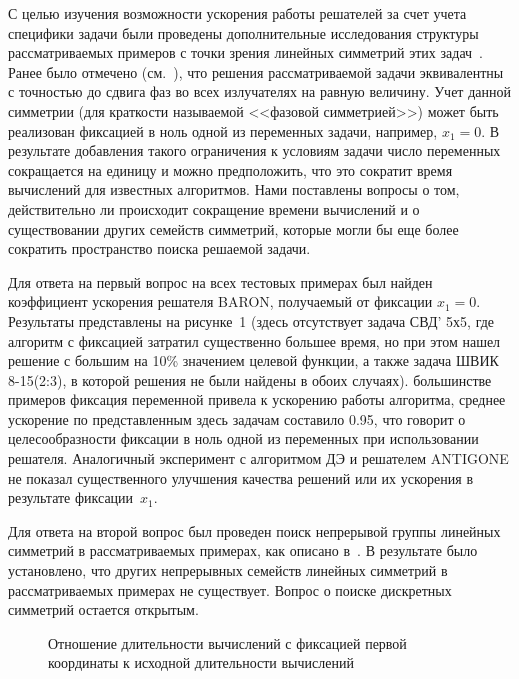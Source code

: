С целью изучения возможности ускорения работы решателей за счет учета специфики задачи были проведены дополнительные исследования
структуры рассматриваемых примеров с точки зрения линейных симметрий этих задач~\cite{yurkov:symmetry}.
Ранее было отмечено (см.~\cite{tyu:daor}), что решения рассматриваемой задачи эквивалентны с точностью до сдвига
фаз во всех излучателях на равную величину.
Учет данной симметрии (для краткости называемой <<фазовой симметрией>>) может
быть реализован фиксацией в ноль одной из переменных задачи, например, $x_1=0$.
В результате добавления такого ограничения к условиям задачи число переменных сокращается
на единицу и можно предположить, что это сократит время вычислений для известных алгоритмов.
Нами поставлены вопросы о том, действительно ли происходит сокращение времени вычислений и о
существовании других семейств симметрий, которые могли бы еще более сократить пространство поиска решаемой задачи.

Для ответа на первый вопрос на всех тестовых примерах был найден коэффициент ускорения решателя BARON,
получаемый от фиксации $x_1=0$. Результаты представлены на рисунке~1 (здесь отсутствует задача СВД' 5х5, где
алгоритм с фиксацией затратил существенно большее время, но при этом нашел решение с большим на 10\% значением
целевой функции, а также задача ШВИК 8-15(2:3), в которой решения не были найдены в обоих случаях).
 большинстве примеров фиксация переменной привела к ускорению работы алгоритма, среднее ускорение по
представленным здесь задачам составило 0.95, что говорит о целесообразности фиксации в ноль одной из переменных
при использовании решателя. Аналогичный эксперимент с алгоритмом ДЭ и решателем ANTIGONE не показал существенного
улучшения качества решений или их ускорения в результате фиксации~$x_1$.

Для ответа на второй вопрос был проведен поиск непрерывой группы линейных симметрий в рассматриваемых примерах,
как описано в~\cite{yurkov:symmetry}. В результате было установлено, что других непрерывных семейств линейных
симметрий в рассматриваемых примерах не существует. Вопрос о поиске дискретных симметрий остается открытым.

\begin{figure}
\caption{Отношение длительности вычислений с фиксацией первой координаты к исходной длительности вычислений}
\label{ris:ring}
\end{figure}

